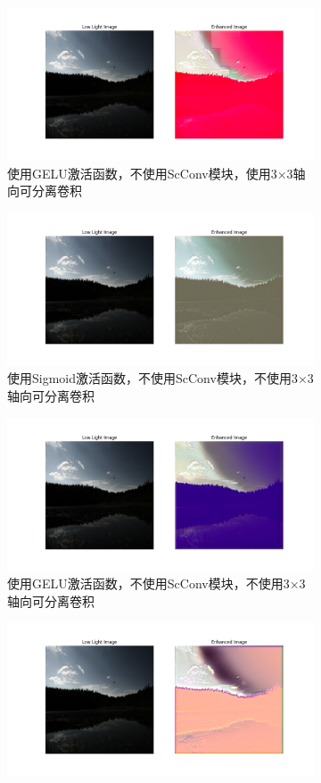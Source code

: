 \documentclass[a4paper]{ctexart}
\begin{document}
		\begin{figure}[htb]
			\centering
			\begin{subfigure}{\textwidth}
				\centering
				\includegraphics[width=0.5\linewidth]{picture/LLIE/Experiment/myplot_without_ScConv_use_GELU_Axial}
				\captionsetup{font=scriptsize}
				\caption{使用GELU激活函数，不使用ScConv模块，使用3$\times$3轴向可分离卷积}
				\label{fig: myplot_without_ScConv_use_GELU_Axial}
			\end{subfigure}
			\begin{subfigure}{\textwidth}
				\centering
				\includegraphics[width=0.5\linewidth]{picture/LLIE/Experiment/myplot_without_ScConv_Sigmoid_Axial}
				\captionsetup{font=scriptsize}
				\caption{使用Sigmoid激活函数，不使用ScConv模块，不使用3$\times$3轴向可分离卷积}
				\label{fig: myplot_without_ScConv_Sigmoid_Axial}	
			\end{subfigure}
			\begin{subfigure}{\textwidth}
				\centering
				\includegraphics[width=0.5\linewidth]{picture/LLIE/Experiment/myplot_use_GELU_without_ScConv_Axial_}
				\captionsetup{font=scriptsize}
				\caption{使用GELU激活函数，不使用ScConv模块，不使用3$\times$3轴向可分离卷积}
				\label{fig: myplot_use_GELU_without_ScConv_Axial_}	
			\end{subfigure}
			\begin{subfigure}{\textwidth}
				\centering
				\includegraphics[width=0.5\linewidth]{picture/LLIE/Experiment/myplot_use_Swish_without_ScConv}

\end{subfigure}
\end{figure}
\end{document}

